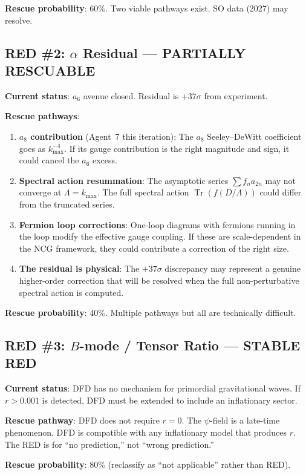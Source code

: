 \documentclass[11pt,a4paper]{article}
\newcommand{\Tr}{\operatorname{Tr}}
\begin{document}
\textbf{Rescue probability}: 60\%. Two viable pathways exist. SO data (2027) may resolve.

\subsection{RED \#2: $\alpha$ Residual --- PARTIALLY RESCUABLE}

\textbf{Current status}: $a_6$ avenue closed. Residual is $+37\sigma$ from experiment.

\textbf{Rescue pathways}:
\begin{enumerate}
\item \textbf{$a_8$ contribution} (Agent~7 this iteration): The $a_8$ Seeley--DeWitt coefficient goes as $k_{\max}^{-4}$. If its gauge contribution is the right magnitude and sign, it could cancel the $a_6$ excess.
\item \textbf{Spectral action resummation}: The asymptotic series $\sum f_n a_{2n}$ may not converge at $\Lambda = k_{\max}$. The full spectral action $\Tr(f(D/\Lambda))$ could differ from the truncated series.
\item \textbf{Fermion loop corrections}: One-loop diagrams with fermions running in the loop modify the effective gauge coupling. If these are scale-dependent in the NCG framework, they could contribute a correction of the right size.
\item \textbf{The residual is physical}: The $+37\sigma$ discrepancy may represent a genuine higher-order correction that will be resolved when the full non-perturbative spectral action is computed.
\end{enumerate}

\textbf{Rescue probability}: 40\%. Multiple pathways but all are technically difficult.

\subsection{RED \#3: $B$-mode / Tensor Ratio --- STABLE RED}

\textbf{Current status}: DFD has no mechanism for primordial gravitational waves. If $r > 0.001$ is detected, DFD must be extended to include an inflationary sector.

\textbf{Rescue pathway}: DFD does not require $r = 0$. The $\psi$-field is a late-time phenomenon. DFD is compatible with any inflationary model that produces $r$. The RED is for ``no prediction,'' not ``wrong prediction.''

\textbf{Rescue probability}: 80\% (reclassify as ``not applicable'' rather than RED).
\end{document}
